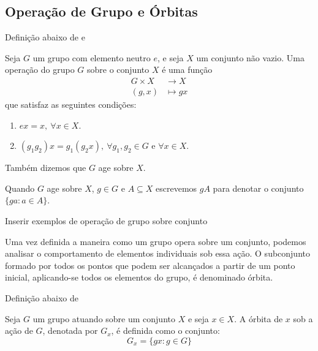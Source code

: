 % 

\subsection{Operação de Grupo e Órbitas}
\label{subsec:operacao_grupo}

Definição abaixo de \textcite[p.~176]{artin2018} e \textcite[p.~88]{Hungerford1974}
\begin{definicao}
    \label{def:operacao_grupo}
    Seja \(G\) um grupo com elemento neutro \(e\), e seja \(X\) um conjunto não vazio. Uma operação do grupo \(G\) sobre o conjunto \(X\) é uma função
    \begin{align*}
        G \times X & \to X      \\
        (g, x)     & \mapsto gx
    \end{align*}
    que satisfaz as seguintes condições:
    \begin{enumerate}
        \item \(ex = x, \ \forall x \in X\).
        \item \((g_1 g_2) x = g_1 (g_2 x), \ \forall g_1, g_2 \in G\) e \(\forall x \in X\).
    \end{enumerate}
\end{definicao}

Também dizemos que \(G\) age sobre \(X\).

\begin{remark}
    Quando \(G\) age sobre \(X\), \(g \in G\) e \(A \subseteq X\) escrevemos \(gA\) para denotar o conjunto \(\{ga: a \in A\}\).
\end{remark}

\begin{exemplo}
    \label{ex:operacao_grupo_conjunto}
    Inserir exemplos de operação de grupo sobre conjunto

\end{exemplo}

Uma vez definida a maneira como um grupo opera sobre um conjunto, podemos analisar o comportamento de elementos individuais sob essa ação. O subconjunto formado por todos os pontos que podem ser alcançados a partir de um ponto inicial, aplicando-se todos os elementos do grupo, é denominado órbita.

Definição abaixo de \textcite[p.~89]{Hungerford1974}

\begin{definicao}[Órbita]
    \label{def:orbita}
    Seja \(G\) um grupo atuando sobre um conjunto \(X\) e seja \(x \in X\). A órbita de \(x\) sob a ação de \(G\), denotada por \(G_x\), é definida como o conjunto:
    \[
        G_x = \{ gx: g \in G \}
    \]
\end{definicao}

